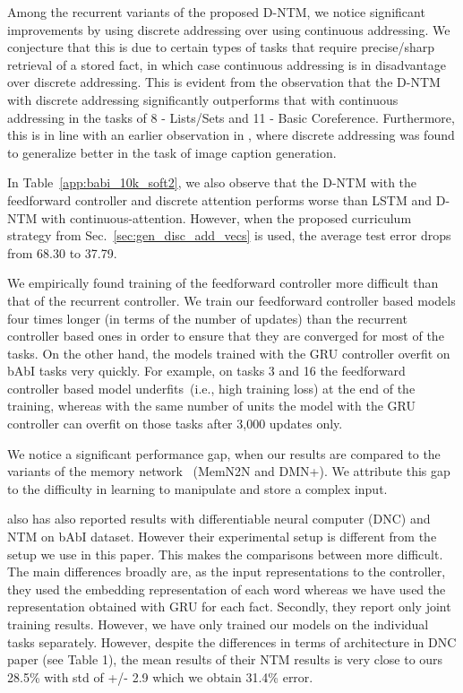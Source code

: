 \documentclass[12pt]{article}
\begin{document}
Among the recurrent variants of the proposed D-NTM, we notice significant improvements by using discrete addressing over using continuous addressing. We conjecture that this is due to certain types of tasks that require precise/sharp retrieval of a stored fact, in which case continuous addressing is in disadvantage over discrete addressing. This is evident from the observation that the D-NTM with discrete addressing significantly outperforms that with continuous addressing in the tasks of 8 - Lists/Sets and 11 - Basic Coreference. Furthermore, this is in line with an earlier observation in \citep{xu2015show}, where discrete addressing was found to generalize better in the task of image caption generation. 

In Table~\ref{app:babi_10k_soft2}, we also observe that the D-NTM with the feedforward controller and discrete attention performs worse than LSTM and D-NTM with continuous-attention. However, when the proposed curriculum strategy from Sec.~\ref{sec:gen_disc_add_vecs} is used, the average test error drops from 68.30 to 37.79.

We empirically found training of the feedforward controller more difficult than that of the recurrent controller. We train our feedforward controller based models four times longer (in terms of the number of updates) than the recurrent controller based ones in order to ensure that they are converged for most of the tasks. On the other hand, the models trained with the GRU controller overfit on bAbI tasks very quickly. For example, on tasks 3 and 16 the feedforward controller based model underfits~(i.e., high training loss) at the end of the training, whereas with the same number of units the model with the GRU controller can overfit on those tasks after 3,000 updates only.

We notice a significant performance gap, when our results are compared to the variants of the memory network~\citep{weston2014memory} (MemN2N and DMN+). We attribute this gap to the difficulty in learning to manipulate and store a complex input. 

\cite{graves2016hybrid} also has also reported results with differentiable neural computer (DNC) and NTM on bAbI dataset. However their experimental setup is different from the setup we use in this paper. This makes the comparisons between more difficult. The main differences broadly are, as the input representations to the controller, they used the embedding representation of each word whereas we have used the representation obtained with GRU for each fact. Secondly, they report only joint training results. However, we have only trained our models on the individual tasks separately. However, despite the differences in terms of architecture in DNC paper (see Table 1), the mean results of their NTM results is very close to ours 28.5\% with std of +/- 2.9 which we obtain 31.4\% error.
\end{document}
